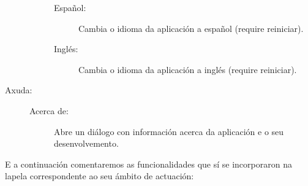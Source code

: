 \begin{description}
\begin{description}
\begin{description}
\item[Español:] \hfill
Cambia o idioma da aplicación a español (require reiniciar).

\end{description}

\begin{description}

\item[Inglés:] \hfill
Cambia o idioma da aplicación a inglés (require reiniciar).

\end{description}

\end{description}

\item[Axuda:] \hfill

\begin{description}

\item[Acerca de:] \hfill
Abre un diálogo con información acerca da aplicación e o seu desenvolvemento.

\end{description}

\end{description}

E a continuación comentaremos as funcionalidades que sí se incorporaron na lapela correspondente ao seu ámbito de actuación:

